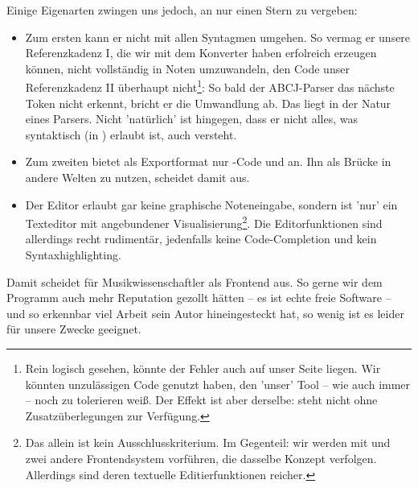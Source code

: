Einige Eigenarten zwingen uns jedoch, an  nur einen Stern zu vergeben:

\begin{itemize}
  \item Zum ersten kann er nicht mit allen Syntagmen umgehen. So vermag er
  unsere Referenzkadenz I, die wir mit dem Konverter  haben
  erfolreich erzeugen können, nicht vollständig in Noten umzuwandeln, den Code
  unser Referenzkadenz II überhaupt nicht\footnote{Rein logisch gesehen, könnte
  der Fehler auch auf unser Seite liegen. Wir könnten unzulässigen Code genutzt
  haben, den 'unser' Tool  -- wie auch immer -- noch zu tolerieren
  weiß. Der Effekt ist aber derselbe:  steht nicht ohne
  Zusatzüberlegungen zur Verfügung.}: So bald der ABCJ-Parser das nächste Token
  nicht erkennt, bricht er die Umwandlung ab. Das liegt in der Natur eines
  Parsers. Nicht 'natürlich' ist hingegen, dass er nicht alles, was syntaktisch
  (in ) erlaubt ist, auch versteht.
  \item Zum zweiten bietet  als Exportformat nur -Code und
   an. Ihn als Brücke in andere Welten zu nutzen, scheidet damit aus.
  \item Der Editor erlaubt gar keine graphische Noteneingabe, sondern ist 'nur'
  ein Texteditor mit angebundener Visualisierung\footnote{Das allein ist kein
  Ausschlusskriterium. Im Gegenteil: wir werden mit  und
   zwei andere Frontendsystem vorführen, die dasselbe Konzept
  verfolgen. Allerdings sind deren textuelle Editierfunktionen reicher.}. Die
  Editorfunktionen sind allerdings recht rudimentär, jedenfalls keine
  Code-Completion und kein Syntaxhighlighting.
\end{itemize}

Damit scheidet  für Musikwissenschaftler als Frontend aus. So gerne
wir dem Programm auch mehr Reputation gezollt hätten -- es ist echte freie
Software -- und so erkennbar viel Arbeit sein Autor hineingesteckt hat, so wenig
ist es leider für unsere Zwecke geeignet.


%
